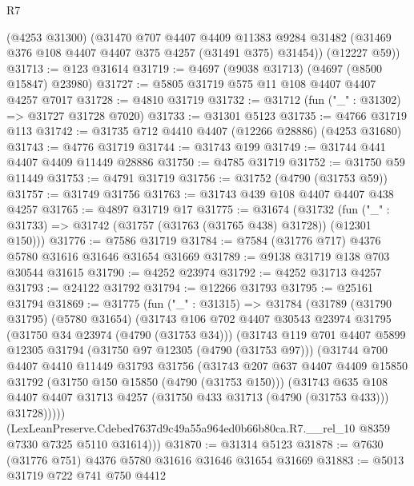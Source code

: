 \begin{lexlean}{R7}
\begin{coremodule}
      (@4253 @31300)
      (@31470
        @707
        @4407
        @4409
        @11383
        @9284
        @31482
        (@31469 @376 @108 @4407 @4407 @375 @4257 (@31491 @375) @31454))
      (@12227 @59))
@31713 := @123 @31614
@31719 := @4697 (@9038 @31713) (@4697 (@8500 @15847) @23980)
@31727 := @5805 @31719 @575 @11 @108 @4407 @4407 @4257 @7017
@31728 := @4810 @31719
@31732 := @31712 (fun ("_" : @31302) => @31727 @31728 @7020)
@31733 := @31301 @5123
@31735 := @4766 @31719 @113
@31742 := @31735 @712 @4410 @4407 (@12266 @28886) (@4253 @31680)
@31743 := @4776 @31719
@31744 := @31743 @199
@31749 := @31744 @441 @4407 @4409 @11449 @28886
@31750 := @4785 @31719
@31752 := @31750 @59 @11449
@31753 := @4791 @31719
@31756 := @31752 (@4790 (@31753 @59))
@31757 := @31749 @31756
@31763 := @31743 @439 @108 @4407 @4407 @438 @4257
@31765 := @4897 @31719 @17
@31775 := @31674
    (@31732 (fun ("_" : @31733) => @31742 (@31757 (@31763 (@31765 @438) @31728)) (@12301 @150)))
@31776 := @7586 @31719
@31784 := @7584 (@31776 @717) @4376 @5780 @31616 @31646 @31654 @31669
@31789 := @9138 @31719 @138 @703 @30544 @31615
@31790 := @4252 @23974
@31792 := @4252 @31713 @4257
@31793 := @24122 @31792
@31794 := @12266 @31793
@31795 := @25161 @31794
@31869 := @31775
    (fun ("_" : @31315) =>
    @31784
      (@31789
        (@31790 @31795)
        (@5780 @31654)
        (@31743
          @106
          @702
          @4407
          @30543
          @23974
          @31795
          (@31750 @34 @23974 (@4790 (@31753 @34)))
          (@31743
            @119
            @701
            @4407
            @5899
            @12305
            @31794
            (@31750 @97 @12305 (@4790 (@31753 @97)))
            (@31744
              @700
              @4407
              @4410
              @11449
              @31793
              @31756
              (@31743
                @207
                @637
                @4407
                @4409
                @15850
                @31792
                (@31750 @150 @15850 (@4790 (@31753 @150)))
                (@31743
                  @635
                  @108
                  @4407
                  @4407
                  @31713
                  @4257
                  (@31750 @433 @31713 (@4790 (@31753 @433)))
                  @31728)))))
        (LexLeanPreserve.Cdebed7637d9c49a55a964ed0b66b80ca.R7.__rel_10
          @8359
          @7330
          @7325
          @5110
          @31614)))
@31870 := @31314 @5123
@31878 := @7630 (@31776 @751) @4376 @5780 @31616 @31646 @31654 @31669
@31883 := @5013 @31719 @722 @741 @750 @4412

\end{coremodule}
\end{lexlean}
